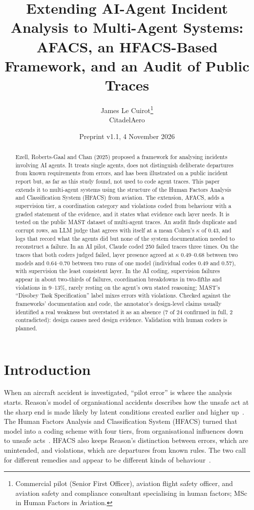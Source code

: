 \documentclass[11pt]{article}
\title{Extending AI-Agent Incident Analysis to Multi-Agent Systems: AFACS, an HFACS-Based Framework, and an Audit of Public Traces}
\author{James Le Cuirot\thanks{Commercial pilot (Senior First Officer), aviation flight safety officer, and aviation safety and compliance consultant specialising in human factors; MSc in Human Factors in Aviation.}\\[2pt] \normalsize CitadelAero}
\date{Preprint v1.1, 4 November 2026}
\begin{document}
\maketitle

\begin{abstract}
\noindent
Ezell, Roberts-Gaal and Chan (2025) proposed a framework for analysing incidents
involving AI agents. It treats single agents, does not distinguish deliberate
departures from known requirements from errors, and has been illustrated on a
public incident report but, as far as this study found, not used to code agent
traces.
This paper extends it to multi-agent systems using the structure of the Human
Factors Analysis and Classification System (HFACS) from aviation. The extension,
AFACS, adds a supervision tier, a coordination category and violations coded from
behaviour with a graded statement of the evidence, and it states what evidence
each layer needs. It is tested on the public MAST dataset of multi-agent traces.
An audit finds duplicate and corrupt rows, an LLM judge that agrees with itself at
a mean Cohen's $\kappa$ of 0.43, and logs that record what the agents did but
none of the system documentation needed to reconstruct a failure. In an AI pilot,
Claude coded 250 failed traces three times. On the traces that both coders judged failed, layer presence agreed at $\kappa$ 0.49--0.68 between two models and 0.64--0.70 between two runs of one model (individual codes 0.49 and 0.57), with supervision the least consistent layer. In the AI coding, supervision failures appear in about two-thirds of failures, coordination breakdowns in two-fifths and violations in
9--13\%, rarely resting on the agent's own stated reasoning; MAST's ``Disobey Task
Specification'' label mixes errors with violations. Checked against the
frameworks' documentation and code, the annotator's design-level claims usually
identified a real weakness but overstated it as an absence (7 of 24 confirmed in
full, 2 contradicted): design causes need design evidence. Validation with human
coders is planned.
\end{abstract}

\section{Introduction}

When an aircraft accident is investigated, ``pilot error'' is where the analysis
starts. Reason's model of organisational accidents describes how the unsafe act
at the sharp end is made likely by latent conditions created earlier and higher
up~\cite{reason1990human,reason1997managing}. The Human Factors Analysis and
Classification System (HFACS) turned that model into a coding scheme with four
tiers, from organisational influences down to unsafe
acts~\cite{shappell2000hfacs,wiegmann2003human}. HFACS also keeps Reason's
distinction between errors, which are unintended, and violations, which are
departures from known rules. The two call for different remedies and appear to be
different kinds of behaviour~\cite{reason1990errors}.
\end{document}
